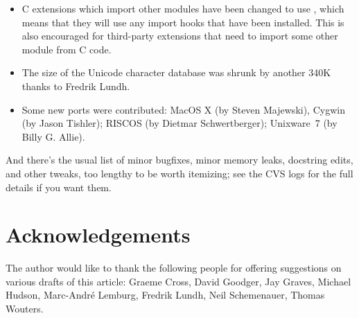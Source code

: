 \documentclass{howto}
\begin{document}
\begin{itemize}
\item C extensions which import other modules have been changed to use
, which means that they will use any
import hooks that have been installed.  This is also encouraged for
third-party extensions that need to import some other module from C
code.  

\item The size of the Unicode character database was shrunk by another
340K thanks to Fredrik Lundh.

\item Some new ports were contributed: MacOS X (by Steven Majewski),
Cygwin (by Jason Tishler); RISCOS (by Dietmar Schwertberger); Unixware~7 
(by Billy G. Allie).

\end{itemize}

And there's the usual list of minor bugfixes, minor memory leaks,
docstring edits, and other tweaks, too lengthy to be worth itemizing;
see the CVS logs for the full details if you want them.


\section{Acknowledgements}

The author would like to thank the following people for offering
suggestions on various drafts of this article: Graeme Cross, David
Goodger, Jay Graves, Michael Hudson, Marc-Andr\'e Lemburg, Fredrik
Lundh, Neil Schemenauer, Thomas Wouters.
\end{document}
